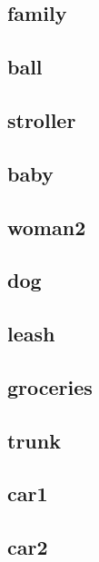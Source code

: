 \documentclass[
]{book}
\begin{document}
\hypertarget{family}{%
\subsection{family}\label{family}}

\hypertarget{ball}{%
\subsection{ball}\label{ball}}

\hypertarget{stroller}{%
\subsection{stroller}\label{stroller}}

\hypertarget{baby}{%
\subsection{baby}\label{baby}}

\hypertarget{woman2}{%
\subsection{woman2}\label{woman2}}

\hypertarget{dog}{%
\subsection{dog}\label{dog}}

\hypertarget{leash}{%
\subsection{leash}\label{leash}}

\hypertarget{groceries}{%
\subsection{groceries}\label{groceries}}

\hypertarget{trunk}{%
\subsection{trunk}\label{trunk}}

\hypertarget{car1}{%
\subsection{car1}\label{car1}}

\hypertarget{car2}{%
\subsection{car2}\label{car2}}
\end{document}
